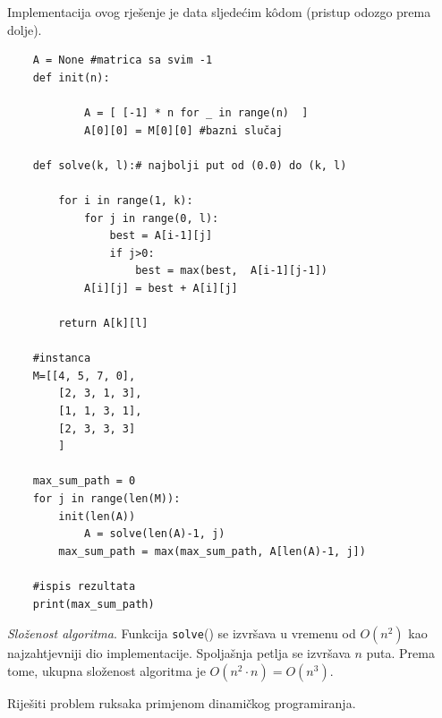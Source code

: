 Implementacija ovog rješenje je data sljedećim k\^odom (pristup odozgo prema dolje).

\begin{verbatim}
	A = None #matrica sa svim -1
	def init(n):
        
            A = [ [-1] * n for _ in range(n)  ]
            A[0][0] = M[0][0] #bazni slučaj
	
	def solve(k, l):# najbolji put od (0.0) do (k, l)
	    
	    for i in range(1, k):
	        for j in range(0, l):
	            best = A[i-1][j]  
	            if j>0:
	                best = max(best,  A[i-1][j-1])
	        A[i][j] = best + A[i][j]
	   
	    return A[k][l]

	#instanca
	M=[[4, 5, 7, 0],
    	[2, 3, 1, 3],
    	[1, 1, 3, 1],
    	[2, 3, 3, 3]
        ]	

	max_sum_path = 0
	for j in range(len(M)):
		init(len(A))
	        A = solve(len(A)-1, j)
		max_sum_path = max(max_sum_path, A[len(A)-1, j])
	
	#ispis rezultata	
	print(max_sum_path)
\end{verbatim}

\textit{Složenost algoritma}. Funkcija \texttt{solve}() se izvršava u vremenu od $O(n^2)$   kao najzahtjevniji dio implementacije. Spoljašnja petlja se izvršava $n$ puta.  Prema tome, ukupna složenost algoritma je $O(n^2 \cdot n)=O(n^3)$.





\begin{example}
	Riješiti problem ruksaka primjenom dinamičkog programiranja.
\end{example}

